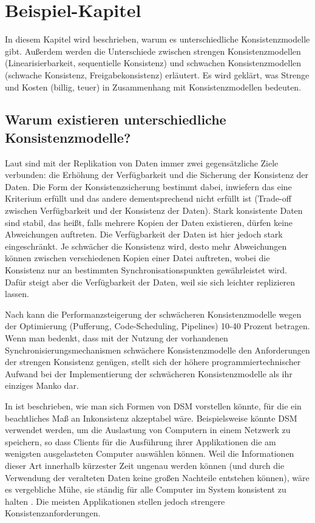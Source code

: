 \chapter{Beispiel-Kapitel}

In diesem Kapitel wird beschrieben, warum es unterschiedliche Konsistenzmodelle gibt. Außerdem werden die Unterschiede zwischen strengen Konsistenzmodellen (Linearisierbarkeit, sequentielle Konsistenz) und schwachen Konsistenzmodellen (schwache Konsistenz, Freigabekonsistenz) erläutert. Es wird geklärt, was Strenge und Kosten (billig, teuer) in Zusammenhang mit Konsistenzmodellen bedeuten.

\section{Warum existieren unterschiedliche Konsistenzmodelle?}

Laut \cite{Malte:97} sind mit der Replikation von Daten immer zwei gegensätzliche Ziele verbunden: die Erhöhung der Verfügbarkeit und die Sicherung der Konsistenz der Daten. Die Form der Konsistenzsicherung bestimmt dabei, inwiefern das eine Kriterium erfüllt und das andere dementsprechend nicht erfüllt ist (Trade-off zwischen Verfügbarkeit und der Konsistenz der Daten). Stark konsistente Daten sind stabil, das heißt, falls mehrere Kopien der Daten existieren, dürfen keine Abweichungen auftreten. Die Verfügbarkeit der Daten ist hier jedoch stark eingeschränkt. Je schwächer die Konsistenz wird, desto mehr Abweichungen können zwischen verschiedenen Kopien einer Datei auftreten, wobei die Konsistenz nur an bestimmten Synchronisationspunkten gewährleistet wird. Dafür steigt aber die Verfügbarkeit der Daten, weil sie sich leichter replizieren lassen.

Nach \cite{Mosberger:93} kann die Performanzsteigerung der schwächeren Konsistenzmodelle wegen der Optimierung (Pufferung, Code-Scheduling, Pipelines) 10-40 Prozent betragen. Wenn man bedenkt, dass mit der Nutzung der vorhandenen Synchronisierungsmechanismen schwächere Konsistenzmodelle den Anforderungen der strengen Konsistenz genügen, stellt sich der höhere programmiertechnischer Aufwand bei der Implementierung der schwächeren Konsistenzmodelle als ihr einziges Manko dar.

In \cite{Cheriton:85} ist beschrieben, wie man sich Formen von DSM vorstellen könnte, für die ein beachtliches Maß an Inkonsistenz akzeptabel wäre. Beispielsweise könnte DSM verwendet werden, um die Auslastung von Computern in einem Netzwerk zu speichern, so dass Clients für die Ausführung ihrer Applikationen die am wenigsten ausgelasteten Computer auswählen können. Weil die Informationen dieser Art innerhalb kürzester Zeit ungenau werden können (und durch die Verwendung der veralteten Daten keine großen Nachteile entstehen können), wäre es vergebliche Mühe, sie ständig für alle Computer im System konsistent zu halten \cite{Coulouris:02}. Die meisten Applikationen stellen jedoch strengere Konsistenzanforderungen.

